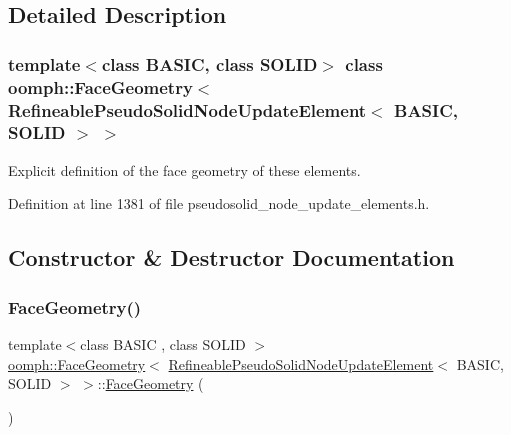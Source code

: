 \subsection{Detailed Description}
\subsubsection*{template$<$class B\+A\+S\+IC, class S\+O\+L\+ID$>$\newline
class oomph\+::\+Face\+Geometry$<$ Refineable\+Pseudo\+Solid\+Node\+Update\+Element$<$ B\+A\+S\+I\+C, S\+O\+L\+I\+D $>$ $>$}

Explicit definition of the face geometry of these elements. 

Definition at line 1381 of file pseudosolid\+\_\+node\+\_\+update\+\_\+elements.\+h.



\subsection{Constructor \& Destructor Documentation}
\mbox{\label{classoomph_1_1FaceGeometry_3_01RefineablePseudoSolidNodeUpdateElement_3_01BASIC_00_01SOLID_01_4_01_4_aa03d04632af1d3cdb9b98f85a2a1a344}} 
\subsubsection{\texorpdfstring{Face\+Geometry()}{FaceGeometry()}}
{\footnotesize\ttfamily template$<$class B\+A\+S\+IC , class S\+O\+L\+ID $>$ \\
\hyperlink{classoomph_1_1FaceGeometry}{oomph\+::\+Face\+Geometry}$<$ \hyperlink{classoomph_1_1RefineablePseudoSolidNodeUpdateElement}{Refineable\+Pseudo\+Solid\+Node\+Update\+Element}$<$ B\+A\+S\+IC, S\+O\+L\+ID $>$ $>$\+::\hyperlink{classoomph_1_1FaceGeometry}{Face\+Geometry} (\begin{DoxyParamCaption}{ }\end{DoxyParamCaption})\hspace{0.3cm}{\ttfamily [inline]}}



